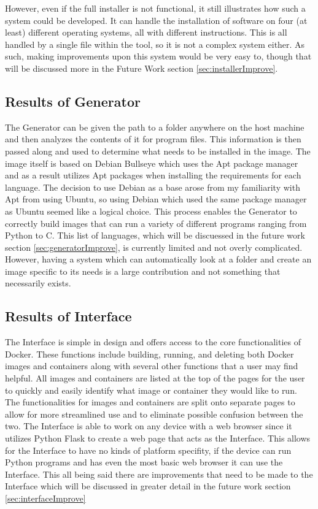 However, even if the full installer is not functional, it still illustrates how such a system could be developed. It can handle the installation of software on four (at least) different operating systems, all with different instructions. This is all handled by a single file within the tool, so it is not a complex system either. As such, making improvements upon this system would be very easy to, though that will be discussed more in the Future Work section \ref{sec:installerImprove}.

\subsection{Results of Generator}
\label{sec:generatorResults}

The Generator can be given the path to a folder anywhere on the host machine and then analyzes the contents of it for program files. This information is then passed along and used to determine what needs to be installed in the image. The image itself is based on Debian Bullseye which uses the Apt package manager and as a result utilizes Apt packages when installing the requirements for each language. The decision to use Debian as a base arose from my familiarity with Apt from using Ubuntu, so using Debian which used the same package manager as Ubuntu seemed like a logical choice. This process enables the Generator to correctly build images that can run a variety of different programs ranging from Python to C. This list of languages, which will be discuessed in the future work section \ref{sec:generatorImprove}, is currently limited and not overly complicated. However, having a system which can automatically look at a folder and create an image specific to its needs is a large contribution and not something that necessarily exists.


\subsection{Results of Interface}
\label{sec:interfaceResults}

The Interface is simple in design and offers access to the core functionalities of Docker. These functions include building, running, and deleting both Docker images and containers along with several other functions that a user may find helpful. All images and containers are listed at the top of the pages for the user to quickly and easily identify what image or container they would like to run. The functionalities for images and containers are split onto separate pages to allow for more streamlined use and to eliminate possible confusion between the two. The Interface is able to work on any device with a web browser since it utilizes Python Flask to create a web page that acts as the Interface. This allows for the Interface to have no kinds of platform specifity, if the device can run Python programs and has even the most basic web browser it can use the Interface. This all being said there are improvements that need to be made to the Interface which will be discussed in greater detail in the future work section \ref{sec:interfaceImprove}


